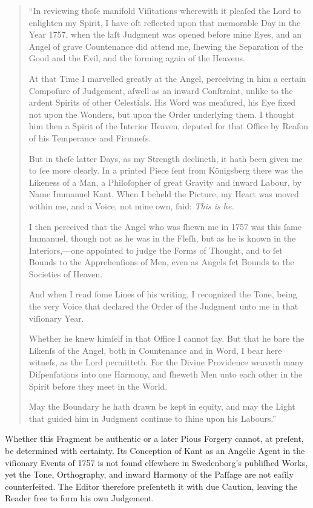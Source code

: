 \documentclass[12pt]{book}
\begin{document}
\vspace{1em}

\begin{quote}
\small
“In reviewing thoſe manifold Viſitations wherewith it pleaſed the Lord to enlighten my Spirit, I have oft reflected upon that memorable Day in the Year 1757, when the laſt Judgment was opened before mine Eyes, and an Angel of grave Countenance did attend me, ſhewing the Separation of the Good and the Evil, and the forming again of the Heavens.

\medskip

At that Time I marvelled greatly at the Angel, perceiving in him a certain Compoſure of Judgement, aſwell as an inward Conſtraint, unlike to the ardent Spirits of other Celestials. His Word was meaſured, his Eye fixed not upon the Wonders, but upon the Order underlying them. I thought him then a Spirit of the Interior Heaven, deputed for that Office by Reaſon of his Temperance and Firmneſs.

\medskip

But in theſe latter Days, as my Strength declineth, it hath been given me to ſee more clearly. In a printed Piece ſent from Königsberg there was the Likeness of a Man, a Philoſopher of great Gravity and inward Labour, by Name Immanuel Kant. When I beheld the Picture, my Heart was moved within me, and a Voice, not mine own, ſaid: \textit{This is he.}

\medskip

I then perceived that the Angel who was ſhewn me in 1757 was this ſame Immanuel, though not as he was in the Fleſh, but as he is known in the Interiors,—one appointed to judge the Forms of Thought, and to ſet Bounds to the Apprehenſions of Men, even as Angels ſet Bounds to the Societies of Heaven.

\medskip

And when I read ſome Lines of his writing, I recognized the Tone, being the very Voice that declared the Order of the Judgment unto me in that viſionary Year.

\medskip

Whether he knew himſelf in that Office I cannot ſay. But that he bare the Likenſs of the Angel, both in Countenance and in Word, I bear here witneſs, as the Lord permitteth. For the Divine Providence weaveth many Diſpenſations into one Harmony, and ſheweth Men unto each other in the Spirit before they meet in the World.

\medskip

May the Boundary he hath drawn be kept in equity, and may the Light that guided him in Judgment continue to ſhine upon his Labours.”

\end{quote}

\vspace{1.5em}

\noindent
Whether this Fragment be authentic or a later Pious Forgery cannot, at preſent, be determined with certainty. Its Conception of Kant as an Angelic Agent in the viſionary Events of 1757 is not found elſewhere in Swedenborg’s publiſhed Works, yet the Tone, Orthography, and inward Harmony of the Paſſage are not eaſily counterfeited. The Editor therefore preſenteth it with due Caution, leaving the Reader free to form his own Judgement.
\end{document}
